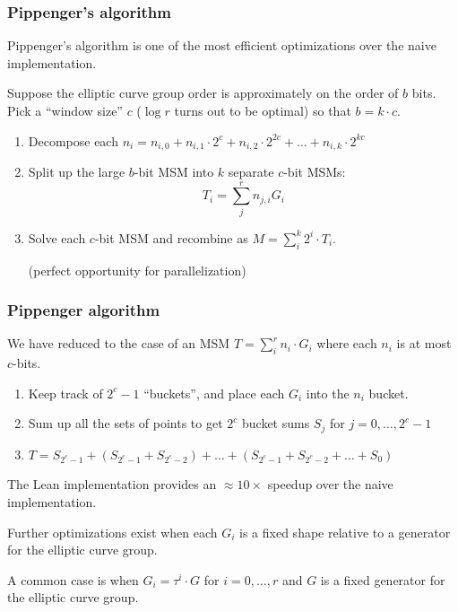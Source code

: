 \documentclass[options]{beamer}
\begin{document}
\begin{frame}
    \frametitle{Pippenger's algorithm}

    Pippenger's algorithm is one of the most efficient optimizations over the naive implementation.
    
    Suppose the elliptic curve group order is approximately on the order of $b$ bits. Pick a ``window size'' $c$ ($\log r$ turns out to be optimal) so that $b = k \cdot c$. 
    \begin{enumerate}
        \item  Decompose each $n_i = n_{i, 0} + n_{i, 1} \cdot 2^c + n_{i, 2} \cdot 2^{2c} + \ldots + n_{i, k} \cdot 2^{k c}$
        \item Split up the large $b$-bit MSM into $k$ separate $c$-bit MSMs:
        $$
        T_i = \sum_j^r n_{j, i} G_i
        $$
        \item Solve each $c$-bit MSM and recombine as $M = \sum_i^k 2^i \cdot T_i$. 
        
        (perfect opportunity for parallelization)
    \end{enumerate}

\end{frame}

\begin{frame}
    \frametitle{Pippenger algorithm}

    We have reduced to the case of an MSM $T = \sum_i^r n_i \cdot G_i$ where each $n_i$ is at most $c$-bits.

    \begin{enumerate}
    \item Keep track of $2^c - 1$ ``buckets'', and place each $G_i$ into the $n_i$ bucket.
    \item Sum up all the sets of points to get $2^c$ bucket sums $S_j$ for $j = 0, \ldots, 2^c - 1$
    \item $T = S_{2^c -1} + (S_{2^c -1} + S_{2^c -2}) + \ldots + (S_{2^c -1} + S_{2^c -2} + \ldots + S_0)$
    \end{enumerate}

    The Lean implementation provides an $\approx 10 \times$ speedup over the naive implementation.

    Further optimizations exist when each $G_i$ is a fixed shape relative to a generator for the elliptic curve group.

    A common case is when $G_i = \tau^i \cdot G$ for $i = 0, \ldots, r$ and $G$ is a fixed generator for the elliptic curve group.
\end{frame}
\end{document}
